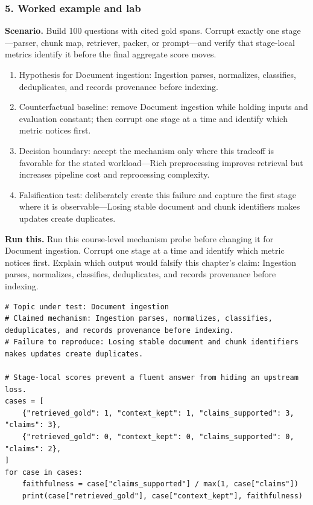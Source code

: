 \subsubsection*{5. Worked example and lab}
\textbf{Scenario.} Build 100 questions with cited gold spans. Corrupt exactly one stage—parser, chunk map, retriever, packer, or prompt—and verify that stage-local metrics identify it before the final aggregate score moves.
\begin{enumerate}
\item Hypothesis for Document ingestion: Ingestion parses, normalizes, classifies, deduplicates, and records provenance before indexing.
\item Counterfactual baseline: remove Document ingestion while holding inputs and evaluation constant; then corrupt one stage at a time and identify which metric notices first.
\item Decision boundary: accept the mechanism only where this tradeoff is favorable for the stated workload—Rich preprocessing improves retrieval but increases pipeline cost and reprocessing complexity.
\item Falsification test: deliberately create this failure and capture the first stage where it is observable—Losing stable document and chunk identifiers makes updates create duplicates.
\end{enumerate}
\textbf{Run this.} Run this course-level mechanism probe before changing it for Document ingestion. Corrupt one stage at a time and identify which metric notices first. Explain which output would falsify this chapter's claim: Ingestion parses, normalizes, classifies, deduplicates, and records provenance before indexing.
\begin{Verbatim}[fontsize=\scriptsize]
# Topic under test: Document ingestion
# Claimed mechanism: Ingestion parses, normalizes, classifies, deduplicates, and records provenance before indexing.
# Failure to reproduce: Losing stable document and chunk identifiers makes updates create duplicates.

# Stage-local scores prevent a fluent answer from hiding an upstream loss.
cases = [
    {"retrieved_gold": 1, "context_kept": 1, "claims_supported": 3, "claims": 3},
    {"retrieved_gold": 0, "context_kept": 0, "claims_supported": 0, "claims": 2},
]
for case in cases:
    faithfulness = case["claims_supported"] / max(1, case["claims"])
    print(case["retrieved_gold"], case["context_kept"], faithfulness)
\end{Verbatim}
